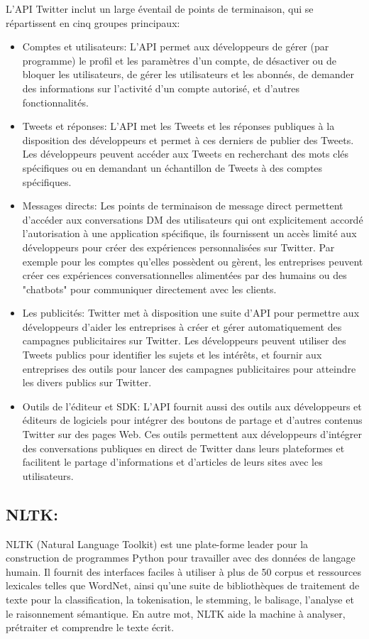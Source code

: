 L'API Twitter inclut un large éventail de points de terminaison, qui se répartissent en cinq groupes principaux:
\begin{itemize}
    \item \textcolor{DispositionColor}{Comptes et utilisateurs:} L'API permet aux développeurs de gérer (par programme) le profil et les paramètres d'un compte, de désactiver ou de bloquer les utilisateurs, de gérer les utilisateurs et les abonnés, de demander des informations sur l'activité d'un compte autorisé, et d'autres fonctionnalités.
    \item \textcolor{DispositionColor}{Tweets et réponses:} L'API met les Tweets et les réponses publiques à la disposition des développeurs et permet à ces derniers de publier des Tweets. Les développeurs peuvent accéder aux Tweets en recherchant des mots clés spécifiques ou en demandant un échantillon de Tweets à des comptes spécifiques.
    \item \textcolor{DispositionColor}{Messages directs:} Les points de terminaison de message direct permettent d'accéder aux conversations DM des utilisateurs qui ont explicitement accordé l'autorisation à une application spécifique, ils fournissent un accès limité aux développeurs pour créer des expériences personnalisées sur Twitter. Par exemple pour les comptes qu'elles possèdent ou gèrent, les entreprises peuvent créer ces expériences conversationnelles alimentées par des humains ou des "chatbots" pour communiquer directement avec les clients.
    \item \textcolor{DispositionColor}{Les publicités:} Twitter met à disposition une suite d'API pour permettre aux développeurs d'aider les entreprises à créer et gérer automatiquement des campagnes publicitaires sur Twitter. Les développeurs peuvent utiliser des Tweets publics pour identifier les sujets et les intérêts, et fournir aux entreprises des outils pour lancer des campagnes publicitaires pour atteindre les divers publics sur Twitter.
    \item \textcolor{DispositionColor}{Outils de l'éditeur et SDK:} L'API fournit aussi des outils aux développeurs et éditeurs de logiciels pour intégrer des boutons de partage et d'autres contenus Twitter sur des pages Web. Ces outils permettent aux développeurs d'intégrer des conversations publiques en direct de Twitter dans leurs plateformes et facilitent le partage d'informations et d'articles de leurs sites avec les utilisateurs.
\end{itemize}
\subsection{NLTK:}
NLTK (Natural Language Toolkit) est une plate-forme leader pour la construction de programmes Python pour travailler avec des données de langage humain. Il fournit des interfaces faciles à utiliser à plus de 50 corpus et ressources lexicales telles que WordNet, ainsi qu'une suite de bibliothèques de traitement de texte pour la classification, la tokenisation, le stemming, le balisage, l'analyse et le raisonnement sémantique. En autre mot, NLTK aide la machine à analyser, prétraiter et comprendre le texte écrit.\cite{bird2009natural}
